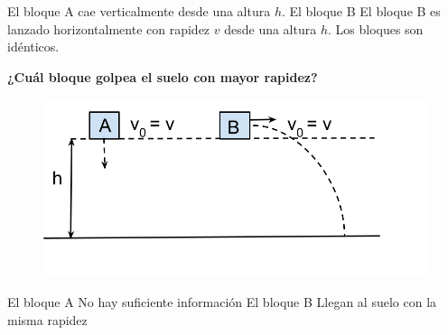 El bloque A cae verticalmente desde una altura $h$. El bloque B
El bloque B es lanzado horizontalmente con rapidez $v$ desde una
altura $h$. Los bloques son idénticos.

\textbf{¿Cuál bloque golpea el suelo con mayor rapidez?}

\begin{minipage}{0.3\textwidth}
    \begin{figure}[H]
        \includegraphics[width=\linewidth]{../images/05647f7ffe4746da78bff56fb4479b08069491aa}
    \end{figure}
\end{minipage}\hfill
\begin{minipage}{0.65\textwidth}
    \begin{choices}
        \choice El bloque A
        \choice No hay suficiente información
        \choice El bloque B
        \CorrectChoice Llegan al suelo con la misma rapidez
    \end{choices}
\end{minipage}